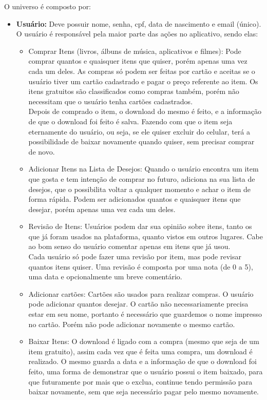 \documentclass[a4paper, 11pt]{article}
\begin{document}
O universo é composto por:
\begin{itemize}
    \item \textbf{Usuário:} Deve possuir nome, senha, cpf, data de nascimento e email (único). O usuário é responsável pela maior parte das ações no aplicativo, sendo elas:
    \begin{itemize}
        \item Comprar Itens (livros, álbuns de música, aplicativos e filmes): Pode comprar quantos e quaisquer itens que quiser, porém apenas uma vez cada um deles. As compras só podem ser feitas por cartão e aceitas se o usuário tiver um cartão cadastrado e pagar o preço referente ao item. Os itens gratuitos são classificados como compras também, porém não necessitam que o usuário tenha cartões cadastrados.\\
        Depois de comprado o item, o download do mesmo é feito, e a informação de que o download foi feito é salva. Fazendo com
        que o item seja eternamente do usuário, ou seja, se ele quiser excluir do celular, terá a possibilidade de baixar novamente quando quiser, sem precisar comprar de novo.
        \\
        \item Adicionar Itens na Lista de Desejos: Quando o usuário encontra um item que gosta e tem intenção de comprar no futuro, adiciona na sua lista de desejos, que o possibilita voltar a qualquer momento e achar o item de forma rápida. Podem ser adicionados quantos e quaisquer itens que desejar, porém apenas uma vez cada um deles.
        \\
        \item Revisão de Itens: Usuários podem dar sua opinião sobre itens, tanto os que já foram usados na plataforma, quanto vistos em outros lugares. Cabe ao bom senso do usuário comentar apenas em itens que já usou. \\
        Cada usuário só pode fazer uma revisão por item, mas pode revisar quantos itens quiser. Uma revisão é composta por uma nota (de 0 a 5), uma data e opcionalmente um breve comentário.
        \\
        \item Adicionar cartões: Cartões são usados para realizar compras. O usuário pode adicionar quantos desejar. O cartão não necessariamente precisa estar em seu nome, portanto é necessário que guardemos o nome impresso no cartão. Porém não pode adicionar novamente o mesmo cartão.
        \\
        \item Baixar Itens: O download é ligado com a compra (mesmo que seja de um item gratuito), assim cada vez que é feita uma compra, um download é realizado. O mesmo guarda a data e a informação de que o download foi feito, uma forma de demonstrar que o usuário possui o item baixado, para que futuramente por mais que o exclua, continue tendo permissão para baixar novamente, sem que seja necessário pagar pelo mesmo novamente.

\end{itemize}
\end{itemize}
\end{document}
